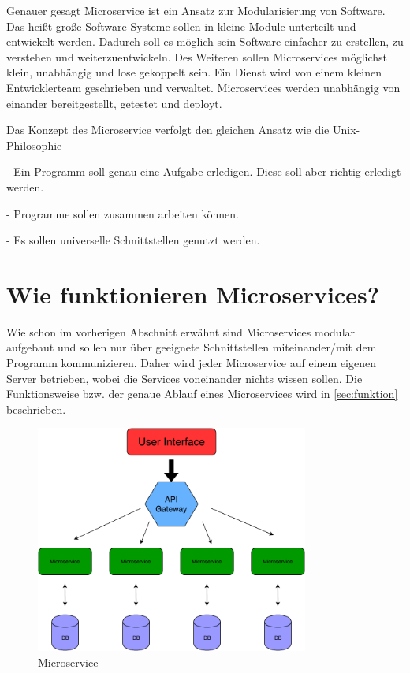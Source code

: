Genauer gesagt Microservice ist ein Ansatz zur Modularisierung von Software. Das heißt große Software-Systeme sollen in kleine Module unterteilt und entwickelt werden.\newline
Dadurch soll es möglich sein Software einfacher zu erstellen, zu verstehen und weiterzuentwickeln. Des Weiteren sollen Microservices möglichst klein, unabhängig und lose gekoppelt sein. Ein Dienst wird von einem kleinen Entwicklerteam geschrieben und verwaltet. Microservices werden unabhängig von einander bereitgestellt, getestet und deployt.\newline\newline 

Das Konzept des Microservice verfolgt den gleichen Ansatz wie die Unix-Philosophie\cite{unixphilosophie}\newline
\begin{description}
 \item - Ein Programm soll genau eine Aufgabe erledigen. Diese soll aber richtig erledigt werden.
 \item - Programme sollen zusammen arbeiten können.
 \item - Es sollen universelle Schnittstellen genutzt werden.
\end{description}


\chapter{Wie funktionieren Microservices?}\label{sec:funktionsweise}

Wie schon im vorherigen Abschnitt erwähnt sind Microservices modular aufgebaut und sollen nur über geeignete Schnittstellen miteinander/mit dem Programm kommunizieren. Daher wird jeder Microservice auf einem eigenen Server betrieben, wobei die Services voneinander nichts wissen sollen. Die Funktionsweise bzw. der genaue Ablauf eines Microservices wird in \ref{sec:funktion} beschrieben.\newline\newline

\begin{figure}[bth]
    \centering
    \includegraphics[width=0.8\textwidth]{Chapters/Bilder/Microservices.pdf}
    \caption{Microservice}
   \label{fig:microservice}
  \end{figure}
  
